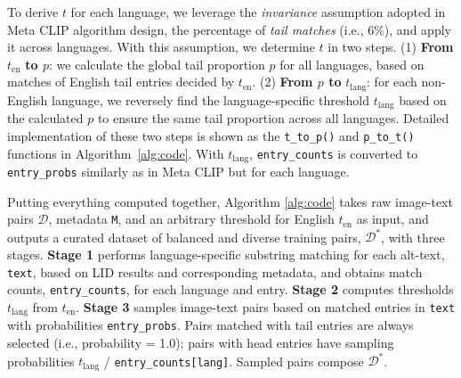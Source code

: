 To derive $t$ for each language, we leverage the \emph{invariance} assumption adopted in Meta CLIP algorithm design, the percentage of \emph{tail matches} (i.e., 6\%), and apply it across languages.
With this assumption, we determine $t$ in two steps. 
(1) \textbf{From} $t_\text{en}$ \textbf{to $p$}: we calculate the global tail proportion $p$ for all languages, based on matches of English tail entries decided by $t_\text{en}$.
(2) \textbf{From $p$ to} $t_\text{lang}$: for each non-English language, we reversely find the language-specific threshold $t_\text{lang}$ based on the calculated $p$ to ensure the same tail proportion across all languages.
Detailed implementation of these two steps is shown as the \texttt{t\_to\_p()} and \texttt{p\_to\_t()} functions in Algorithm~\ref{alg:code}. With $t_\text{lang}$, \texttt{entry\_counts} is converted to \texttt{entry\_probs} similarly as in Meta CLIP but for each language.

Putting everything computed together, 
Algorithm \ref{alg:code} takes raw image-text pairs $\mathcal{D}$, metadata \texttt{M}, and an arbitrary threshold for English $t_\text{en}$ as input, and outputs a curated dataset of balanced and diverse training pairs, $\mathcal{D}^\ast$, with three stages.
\textbf{Stage 1} performs language-specific substring matching for each alt-text, \texttt{text}, based on LID results and corresponding metadata, and obtains match counts, \texttt{entry\_counts}, for each language and entry.
\textbf{Stage 2} computes thresholds $t_\text{lang}$ from $t_\text{en}$.
\textbf{Stage 3} samples image-text pairs based on matched entries in \texttt{text} with probabilities \texttt{entry\_probs}. Pairs matched with tail entries are always selected (i.e., probability = 1.0); pairs with head entries have sampling probabilities $t_\text{lang}$ / \texttt{entry\_counts[lang]}.
Sampled pairs compose $\mathcal{D}^\ast$.

